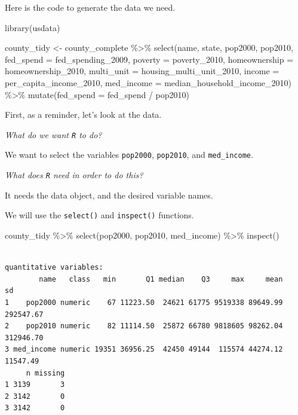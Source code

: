 \documentclass[
  letterpaper,
  DIV=11,
  numbers=noendperiod]{scrreprt}
\newenvironment{Shaded}{\begin{snugshade}}{\end{snugshade}}
\newcommand{\AttributeTok}[1]{\textcolor[rgb]{0.40,0.45,0.13}{#1}}
\newcommand{\FunctionTok}[1]{\textcolor[rgb]{0.28,0.35,0.67}{#1}}
\newcommand{\NormalTok}[1]{\textcolor[rgb]{0.00,0.23,0.31}{#1}}
\newcommand{\OtherTok}[1]{\textcolor[rgb]{0.00,0.23,0.31}{#1}}
\newcommand{\SpecialCharTok}[1]{\textcolor[rgb]{0.37,0.37,0.37}{#1}}
\begin{document}
Here is the code to generate the data we need.

\begin{Shaded}
\begin{Highlighting}[]
\FunctionTok{library}\NormalTok{(usdata)}
\end{Highlighting}
\end{Shaded}

\begin{Shaded}
\begin{Highlighting}[]
\NormalTok{county\_tidy }\OtherTok{\textless{}{-}}\NormalTok{ county\_complete }\SpecialCharTok{\%\textgreater{}\%} 
  \FunctionTok{select}\NormalTok{(name, state, pop2000, pop2010, }\AttributeTok{fed\_spend =}\NormalTok{ fed\_spending\_2009, }
         \AttributeTok{poverty =}\NormalTok{ poverty\_2010, }\AttributeTok{homeownership =}\NormalTok{ homeownership\_2010, }
         \AttributeTok{multi\_unit =}\NormalTok{ housing\_multi\_unit\_2010, }\AttributeTok{income =}\NormalTok{ per\_capita\_income\_2010, }
         \AttributeTok{med\_income =}\NormalTok{ median\_household\_income\_2010) }\SpecialCharTok{\%\textgreater{}\%}
  \FunctionTok{mutate}\NormalTok{(}\AttributeTok{fed\_spend =}\NormalTok{ fed\_spend }\SpecialCharTok{/}\NormalTok{ pop2010)}
\end{Highlighting}
\end{Shaded}

First, as a reminder, let's look at the data.

\emph{What do we want \texttt{R} to do?}

We want to select the variables \texttt{pop2000}, \texttt{pop2010}, and
\texttt{med\_income}.

\emph{What does \texttt{R} need in order to do this?}

It needs the data object, and the desired variable names.

We will use the \texttt{select()} and \texttt{inspect()} functions.

\begin{Shaded}
\begin{Highlighting}[]
\NormalTok{county\_tidy }\SpecialCharTok{\%\textgreater{}\%}
  \FunctionTok{select}\NormalTok{(pop2000, pop2010, med\_income) }\SpecialCharTok{\%\textgreater{}\%}
  \FunctionTok{inspect}\NormalTok{()}
\end{Highlighting}
\end{Shaded}

\begin{verbatim}

quantitative variables:  
        name   class   min       Q1 median    Q3     max     mean        sd
1    pop2000 numeric    67 11223.50  24621 61775 9519338 89649.99 292547.67
2    pop2010 numeric    82 11114.50  25872 66780 9818605 98262.04 312946.70
3 med_income numeric 19351 36956.25  42450 49144  115574 44274.12  11547.49
     n missing
1 3139       3
2 3142       0
3 3142       0
\end{verbatim}
\end{document}
